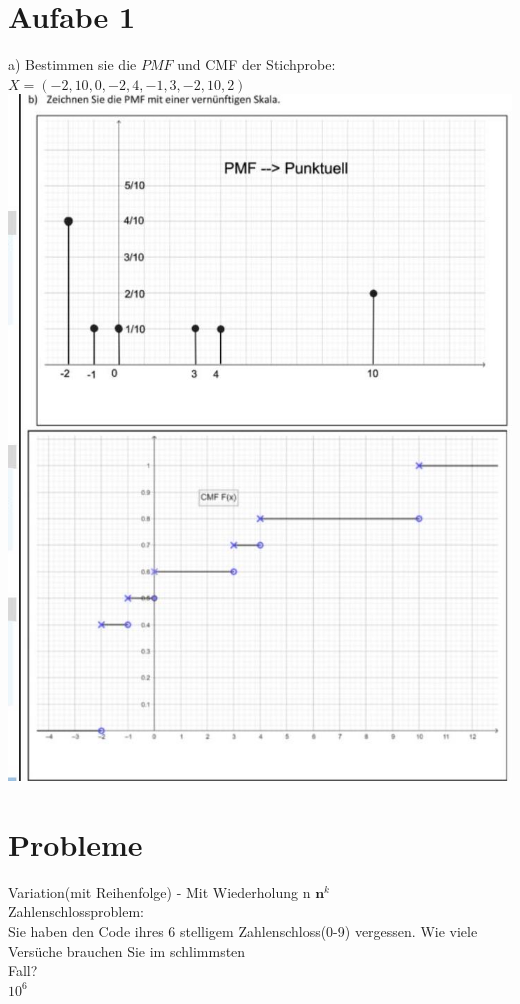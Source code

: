 \documentclass[10pt]{article}
\begin{document}
\section*{Aufabe 1}
a) Bestimmen sie die $P M F$ und CMF der Stichprobe: $X=(-2,10,0,-2,4,-1,3,-2,10,2)$\\
\includegraphics[width=\linewidth]{images/2024_12_29_0906b02acf849bda8665g-2(1)}

\section*{Probleme}
Variation(mit Reihenfolge) - Mit Wiederholung n $\mathbf{n}^{k}$\\
Zahlenschlossproblem:\\
Sie haben den Code ihres 6 stelligem Zahlenschloss(0-9) vergessen. Wie viele Versüche brauchen Sie im schlimmsten\\
Fall?\\
$10^{6}$
\end{document}
